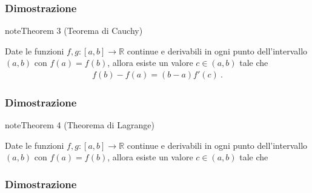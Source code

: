 \documentclass[letterpaper,10pt,english]{jupyterBook}
\begin{document}
\subsubsection*{Dimostrazione}

\sphinxAtStartPar
{}
\label{ch/infinitesimal_calculus/derivatives:theorem-2}
\begin{sphinxadmonition}{note}{Theorem 3 (Teorema di Cauchy)}



\sphinxAtStartPar
Date le funzioni \(f, g: [a,b] \rightarrow \mathbb{R}\) continue e derivabili in ogni punto dell’intervallo \((a,b)\) con \(f(a) = f(b)\), allora esiste un valore \(c \in (a,b)\) tale che
\begin{equation*}
\begin{split}f(b) - f(a) = (b -  a) f'(c) \ .\end{split}
\end{equation*}\end{sphinxadmonition}
\subsubsection*{Dimostrazione}

\sphinxAtStartPar
{}
\label{ch/infinitesimal_calculus/derivatives:theorem-3}
\begin{sphinxadmonition}{note}{Theorem 4 (Theorema di Lagrange)}



\sphinxAtStartPar
Date le funzioni \(f, g: [a,b] \rightarrow \mathbb{R}\) continue e derivabili in ogni punto dell’intervallo \((a,b)\) con \(f(a) = f(b)\), allora esiste un valore \(c \in (a,b)\) tale che
\end{sphinxadmonition}
\subsubsection*{Dimostrazione}
\end{document}
